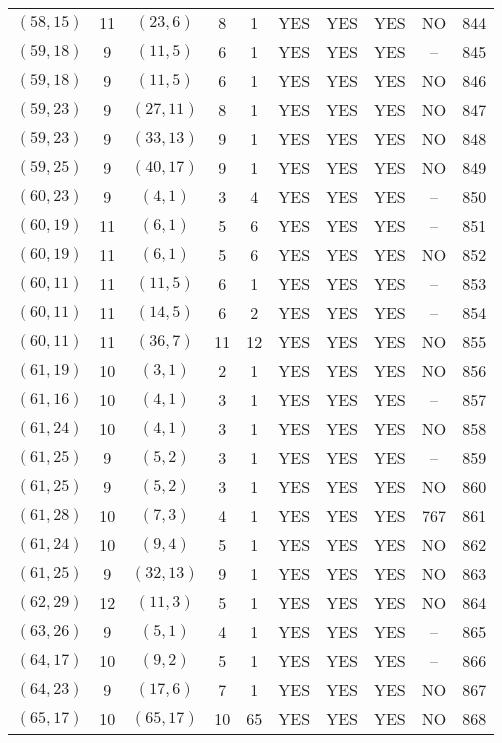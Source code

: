 \begin{longtable}{|c|c|c|c|c|c|c|c|c|c|}
$(58, 15)$ & 11 & $(23, 6)$ & 8 & 1 & YES & YES & YES & NO & 844\\
$(59, 18)$ & 9 & $(11, 5)$ & 6 & 1 & YES & YES & YES & -- & 845\\
$(59, 18)$ & 9 & $(11, 5)$ & 6 & 1 & YES & YES & YES & NO & 846\\
$(59, 23)$ & 9 & $(27, 11)$ & 8 & 1 & YES & YES & YES & NO & 847\\
$(59, 23)$ & 9 & $(33, 13)$ & 9 & 1 & YES & YES & YES & NO & 848\\
$(59, 25)$ & 9 & $(40, 17)$ & 9 & 1 & YES & YES & YES & NO & 849\\
$(60, 23)$ & 9 & $(4, 1)$ & 3 & 4 & YES & YES & YES & -- & 850\\
$(60, 19)$ & 11 & $(6, 1)$ & 5 & 6 & YES & YES & YES & -- & 851\\
$(60, 19)$ & 11 & $(6, 1)$ & 5 & 6 & YES & YES & YES & NO & 852\\
$(60, 11)$ & 11 & $(11, 5)$ & 6 & 1 & YES & YES & YES & -- & 853\\
$(60, 11)$ & 11 & $(14, 5)$ & 6 & 2 & YES & YES & YES & -- & 854\\
$(60, 11)$ & 11 & $(36, 7)$ & 11 & 12 & YES & YES & YES & NO & 855\\
$(61, 19)$ & 10 & $(3, 1)$ & 2 & 1 & YES & YES & YES & NO & 856\\
$(61, 16)$ & 10 & $(4, 1)$ & 3 & 1 & YES & YES & YES & -- & 857\\
$(61, 24)$ & 10 & $(4, 1)$ & 3 & 1 & YES & YES & YES & NO & 858\\
$(61, 25)$ & 9 & $(5, 2)$ & 3 & 1 & YES & YES & YES & -- & 859\\
$(61, 25)$ & 9 & $(5, 2)$ & 3 & 1 & YES & YES & YES & NO & 860\\
$(61, 28)$ & 10 & $(7, 3)$ & 4 & 1 & YES & YES & YES & 767 & 861\\
$(61, 24)$ & 10 & $(9, 4)$ & 5 & 1 & YES & YES & YES & NO & 862\\
$(61, 25)$ & 9 & $(32, 13)$ & 9 & 1 & YES & YES & YES & NO & 863\\
$(62, 29)$ & 12 & $(11, 3)$ & 5 & 1 & YES & YES & YES & NO & 864\\
$(63, 26)$ & 9 & $(5, 1)$ & 4 & 1 & YES & YES & YES & -- & 865\\
$(64, 17)$ & 10 & $(9, 2)$ & 5 & 1 & YES & YES & YES & -- & 866\\
$(64, 23)$ & 9 & $(17, 6)$ & 7 & 1 & YES & YES & YES & NO & 867\\
$(65, 17)$ & 10 & $(65, 17)$ & 10 & 65 & YES & YES & YES & NO & 868\\

\end{longtable}

